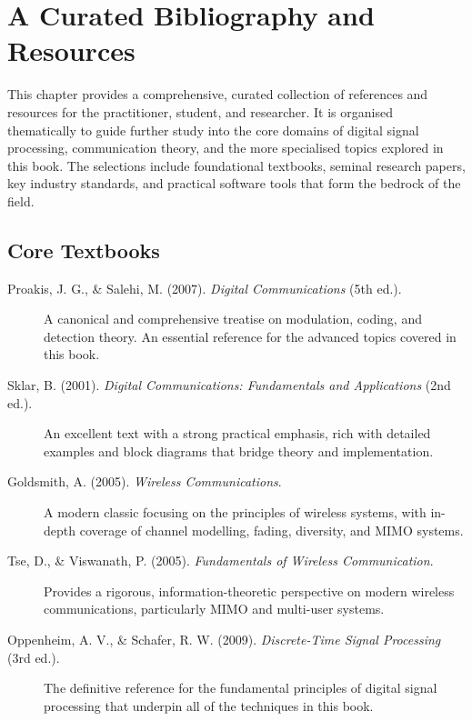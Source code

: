 
\chapter{A Curated Bibliography and Resources}
\label{ch:bibliography}

\begin{nontechnical}
    This chapter provides a comprehensive, curated collection of references and resources for the practitioner, student, and researcher. It is organised thematically to guide further study into the core domains of digital signal processing, communication theory, and the more specialised topics explored in this book. The selections include foundational textbooks, seminal research papers, key industry standards, and practical software tools that form the bedrock of the field.
\end{nontechnical}

\section{Core Textbooks}

\begin{description}
    \item[Proakis, J. G., \& Salehi, M. (2007). \emph{Digital Communications} (5th ed.).] A canonical and comprehensive treatise on modulation, coding, and detection theory. An essential reference for the advanced topics covered in this book.
    \item[Sklar, B. (2001). \emph{Digital Communications: Fundamentals and Applications} (2nd ed.).] An excellent text with a strong practical emphasis, rich with detailed examples and block diagrams that bridge theory and implementation.
    \item[Goldsmith, A. (2005). \emph{Wireless Communications}.] A modern classic focusing on the principles of wireless systems, with in-depth coverage of channel modelling, fading, diversity, and MIMO systems.
    \item[Tse, D., \& Viswanath, P. (2005). \emph{Fundamentals of Wireless Communication}.] Provides a rigorous, information-theoretic perspective on modern wireless communications, particularly MIMO and multi-user systems.
    \item[Oppenheim, A. V., \& Schafer, R. W. (2009). \emph{Discrete-Time Signal Processing} (3rd ed.).] The definitive reference for the fundamental principles of digital signal processing that underpin all of the techniques in this book.
\end{description}

